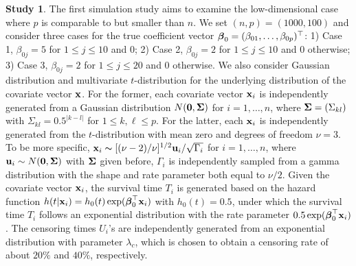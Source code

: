 \documentclass[11pt]{article}
\newcommand{\bSigma}{\mbox{\boldmath $\Sigma$}}
\def\bx{{\bf x}}
\def\u{{\bf u}}
\newcommand{\bbeta}{\mbox{\boldmath $\beta$}}
\begin{document}
{\bf Study 1}. The first simulation study aims to examine the low-dimensional case where $p$ is comparable to but smaller than $n$. We set $(n, p)=(1000, 100)$ and consider three cases for the true coefficient vector $\bbeta_0=(\beta_{01}, \ldots, \beta_{0p})^{\top}$:
1) Case 1, $\beta_{0j}=5$ for $1\leq j\leq 10$ and $0$; 2) Case 2, $\beta_{0j}=2$ for $1\leq j\leq 10$ and $0$ otherwise; 3) Case 3, $\beta_{0j}=2$ for $1\leq j\leq 20$ and $0$ otherwise.
We also consider Gaussian distribution and multivariate $t$-distribution for the underlying distribution of the covariate vector $\bx$. For the former, each covariate vector $\bx_i$ is independently generated from a Gaussian distribution $N(\mathbf{0},\bSigma)$ for $i=1, \ldots, n$, where $\bSigma=(\Sigma_{kl})$ with $\Sigma_{kl}=0.5^{|k-l|}$ for $1\leq k, \ell\leq p$. For the latter, each $\bx_i$ is independently generated from the $t$-distribution with mean zero and degrees of freedom $\nu=3$. To be more specific,  
$\bx_i\thicksim [(\nu-2)/\nu]^{1/2}\u_i/\sqrt{\Gamma_i}$ for $i=1, \ldots, n$,
where $\u_i\sim N(\textbf{0}, \bSigma)$ with $\bSigma$ given before,
$\Gamma_i$ is independently sampled from a gamma distribution with the shape and rate parameter both equal to $\nu/2$. 
Given the covariate vector $\bx_i$, the survival time 
$T_i$ is generated based on the hazard function
$h(t|\bx_i) = h_0(t)\exp(\bbeta_0^{\top}\bx_i)$ with $h_0(t)=0.5$,
under which the survival time $T_i$ follows an exponential distribution with the rate parameter $0.5\exp(\bbeta_0^{\top}\bx_i)$.
The censoring times $U_i$'s are independently generated from an exponential distribution with parameter $\lambda_{c}$, which is chosen to obtain a censoring rate of about $20\%$ and $40\%$, respectively. 
\end{document}

